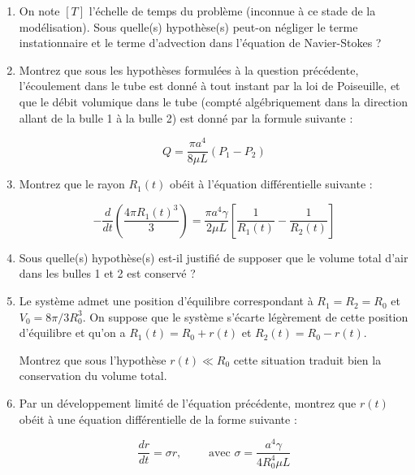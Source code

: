 {\begin{enumerate}


\item On note $[T]$ l'échelle de temps du problème (inconnue à ce stade de la modélisation). 
Sous quelle(s) hypothèse(s) peut-on négliger le terme instationnaire et le terme d'advection dans l'équation de Navier-Stokes ?


\item
Montrez que sous les hypothèses formulées à la question précédente, l'écoulement dans
le tube est donné à tout instant par la loi de Poiseuille, et que le débit volumique
dans le tube (compté algébriquement dans la direction allant de la bulle
1 à la bulle 2) est donné par la formule suivante :

$$
Q = \frac{\pi a^4}{8 \mu L} (P_1-P_2)
$$



\item Montrez que le rayon $R_1(t)$ obéit à l'équation 
différentielle suivante :

$$
- \frac{d}{dt} \left( \frac{4 \pi R_1(t)^3}{3} \right) 
= \frac{\pi a^4\gamma }{2 \mu L} \left[ \frac{1}{R_1(t)} -     \frac{1}{R_2(t)}  \right]
$$

\item Sous quelle(s) hypothèse(s) est-il justifié de supposer que le volume
total d'air dans les bulles 1 et 2 est conservé ?

\item Le système admet une position d'équilibre correspondant à $R_1 = R_2 = R_0$ 
et $V_0 = 8 \pi/3 R_0^3$. On suppose que le système s'écarte légèrement 
de cette position d'équilibre et qu'on a $R_1(t) = R_0 + r(t)$ et $R_2(t) = R_0 - r(t)$.

Montrez que sous l'hypothèse $r(t) \ll R_0$ cette situation traduit bien la conservation du volume total. 


\item Par un développement limité de l'équation précédente, montrez que $r(t)$ 
obéit à une équation différentielle de la forme suivante :

$$
\frac{dr}{dt} 
= \sigma r , \qquad  \mbox{ avec } \sigma = \frac{a^4 \gamma}{4 R_0^4 \mu L} 
$$


\end{enumerate}}
